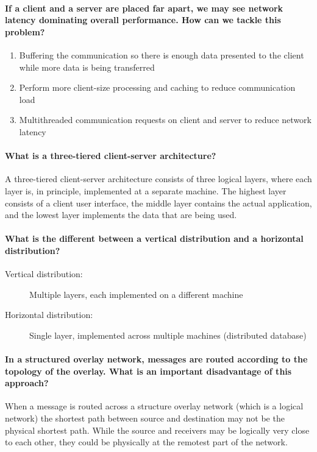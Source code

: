 \paragraph{If a client and a server are placed far apart, we may see network latency dominating overall performance. How can we tackle this problem?}
\begin{enumerate}
	\item Buffering the communication so there is enough data presented to the client while more data is being transferred	
	\item Perform more client-size processing and caching to reduce communication load
	\item Multithreaded communication requests on client and server to reduce network latency
\end{enumerate}


\paragraph{What is a three-tiered client-server architecture?}
A three-tiered client-server architecture consists of three logical layers, where each layer is, in principle, implemented at a separate machine. The highest layer consists of a client user interface, the middle layer contains the actual application, and the lowest layer implements the data that are being used.

\paragraph{What is the different between a vertical distribution and a horizontal distribution?}
\begin{description}
	\item[Vertical distribution:] Multiple layers, each implemented on a different machine
	\item[Horizontal distribution:] Single layer, implemented across multiple machines (distributed database)
\end{description}

\paragraph{In a structured overlay network, messages are routed according to the topology of the overlay. What is an important disadvantage of this approach?}
When a message is routed across a structure overlay network (which is a logical network) the shortest path between source and destination may not be the physical shortest path. While the source and receivers may be logically very close to each other, they could be physically at the remotest part of the network.